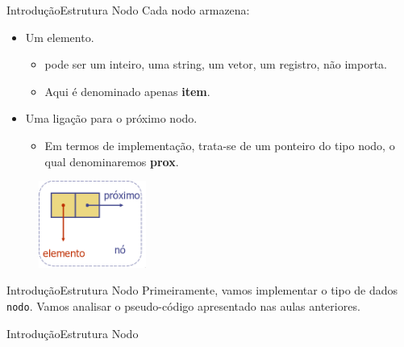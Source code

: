 \documentclass[aspectratio=169]{beamer}
\begin{document}
\begin{frame}{Introdução}{Estrutura Nodo}
Cada nodo armazena:
\begin{itemize}
 \item Um elemento.
  \begin{itemize}
  \item pode ser um inteiro, uma string, um vetor, um registro, não importa. 
  \item Aqui é denominado apenas {\bf item}.
  \end{itemize}  
 \item Uma ligação para o próximo nodo. 
 \begin{itemize}
 \item Em termos de implementação, trata-se de um ponteiro do tipo nodo, o qual denominaremos {\bf prox}.
 \end{itemize}
 \end{itemize}
\begin{figure}[!h]
  \centering
   \includegraphics[width=100pt]{imagens/nodo.png}
  \label{fig_introducao}
\end{figure}
\end{frame}


\begin{frame}[fragile]{Introdução}{Estrutura Nodo}
Primeiramente, vamos implementar o tipo de dados \verb|nodo|. Vamos analisar o pseudo-código apresentado nas aulas anteriores.
\end{frame}


\begin{frame}[fragile]{Introdução}{Estrutura Nodo}
\begin{algorithm}[H]
\caption{Nodo} 
\label{Nodo}
\end{algorithm} 
\end{frame}

\end{document}
